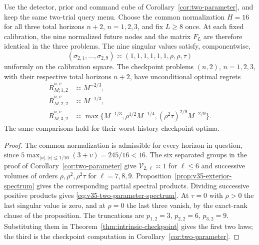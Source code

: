 \begin{corollary}
\label{cor:v35-fixed-future}
Use the detector, prior and command cube of
Corollary~\ref{cor:two-parameter}, and keep the same two-trial query
menu. Choose the common normalization $H=16$ for all three total
horizons $n+2$, $n=1,2,3$, and fix $L\ge8$ once. At each fixed
calibration, the nine normalized future nodes and the matrix $F_L$
are therefore identical in the three problems. The nine singular
values satisfy, componentwise,
\begin{equation}\label{eq:v35-two-parameter-spectrum}
 (\sigma_{2,1},\ldots,\sigma_{2,9})
       \asymp(1,1,1,1,1,1,\rho,\rho,\tau)
\end{equation}
uniformly on the calibration square. The checkpoint problems
$(n,2)$, $n=1,2,3$, with their respective total horizons $n+2$,
have unconditional optimal regrets
\begin{equation}\label{eq:v35-fixed-future}
 \begin{split}
 \overline R_{M;1,2}^{u,v}&\asymp M^{-2/3},\\
 \overline R_{M;2,2}^{u,v}&\asymp M^{-1/3},\\
 \overline R_{M;3,2}^{u,v}&\asymp
  \max\{M^{-1/3},\rho^{1/2}M^{-1/4},
                       (\rho^2\tau)^{2/9}M^{-2/9}\}.
 \end{split}
\end{equation}
The same comparisons hold for their worst-history checkpoint optima.
\end{corollary}
\begin{proof}
The common normalization is admissible for every horizon in question,
since $5\max_{|u|,|v|\le1/16}(3+v)=245/16<16$.
The six separated groups in the proof of
Corollary~\ref{cor:two-parameter} give
$\mathcal V_{2,\ell}\asymp1$ for $\ell\le6$ and successive
volumes of orders $\rho,\rho^2,\rho^2\tau$ for $\ell=7,8,9$.
Proposition~\ref{prop:v35-exterior-spectrum} gives the corresponding
partial spectral products. Dividing successive positive products
gives \eqref{eq:v35-two-parameter-spectrum}. At $\tau=0$ with
$\rho>0$ the last singular value is zero, and at $\rho=0$ the last
three vanish, by the exact-rank clause of the proposition.
The truncations are $p_{1,2}=3$, $p_{2,2}=6$, $p_{3,2}=9$.
Substituting them in Theorem~\ref{thm:intrinsic-checkpoint} gives
the first two laws; the third is the checkpoint computation in
Corollary~\ref{cor:two-parameter}.
\end{proof}

